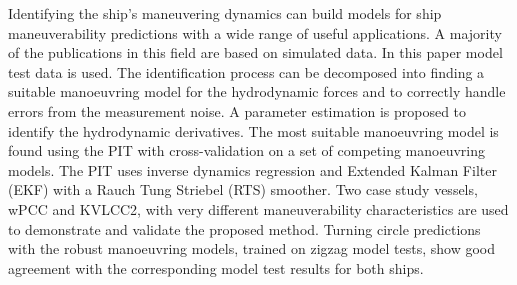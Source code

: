 Identifying the ship's maneuvering dynamics can build models for ship maneuverability predictions with a wide range of useful applications. 
A majority of the publications in this field are based on simulated data. In this paper model test data is used. The identification process can be decomposed into finding a suitable manoeuvring model  for the hydrodynamic forces and to correctly handle errors from the measurement noise. A parameter estimation is proposed to identify the hydrodynamic derivatives. The most suitable manoeuvring model is found using the PIT with cross-validation on a set of competing manoeuvring models. The PIT uses inverse dynamics regression and Extended Kalman Filter (EKF) with a Rauch Tung Striebel (RTS) smoother. Two case study vessels, wPCC and KVLCC2, with very different maneuverability characteristics are used to demonstrate and validate the proposed method. Turning circle predictions with the robust manoeuvring models, trained on zigzag model tests, show good agreement with the corresponding model test results for both ships.
